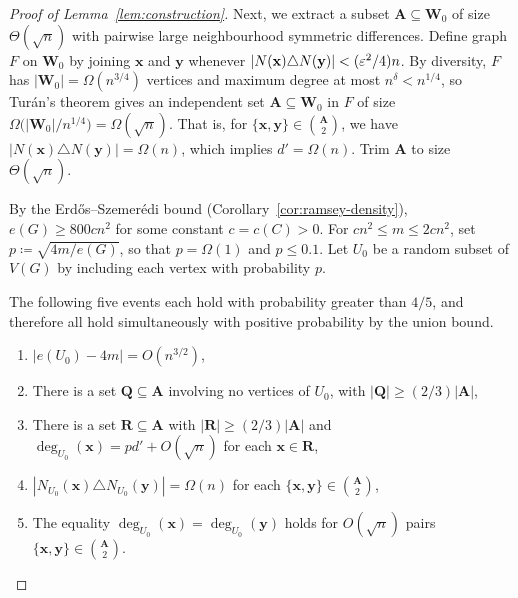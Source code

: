 \begin{proof}[Proof of Lemma~\ref{lem:construction}]
Next, we extract a subset $\mathbf{A} \subseteq \mathbf{W}_0$ of size $\Theta(\sqrt{n})$ with pairwise large neighbourhood symmetric differences. Define graph $F$ on $\mathbf{W}_0$ by joining $\mathbf{x}$ and $\mathbf{y}$ whenever $|N(\mathbf{x}) \triangle N(\mathbf{y})| < (\varepsilon^2/4)n$. By diversity, $F$ has $|\mathbf{W}_0| = \Omega(n^{3/4})$ vertices and maximum degree at most $n^{\delta} < n^{1/4}$, so Tur\'{a}n's theorem gives an independent set $\mathbf{A} \subseteq \mathbf{W}_0$ in $F$ of size $\Omega\bigl(|\mathbf{W}_0|/n^{1/4}\bigr) = \Omega(\sqrt{n})$. That is, for $\{\mathbf{x}, \mathbf{y}\} \in \binom{\mathbf{A}}{2}$, we have $|N(\mathbf{x}) \triangle N(\mathbf{y})| = \Omega(n)$, which implies $d' = \Omega(n)$. Trim $\mathbf{A}$ to size $\Theta(\sqrt{n})$.

By the Erd\H{o}s--Szemer\'{e}di bound (Corollary~\ref{cor:ramsey-density}), $e(G) \geq 800cn^2$ for some constant $c = c(C) > 0$. For $cn^2 \leq m \leq 2cn^2$, set $p \coloneqq \sqrt{4m/e(G)}$, so that $p = \Omega(1)$ and $p \leq 0.1$. Let $U_0$ be a random subset of $V(G)$ by including each vertex with probability $p$. 

\begin{claim}
  The following five events each hold with probability greater than $4/5$, and therefore all hold simultaneously with positive probability by the union bound.

  \begin{enumerate}
    \item[(i)] $|e(U_0) - 4m| = O(n^{3/2})$,
    \item[(ii)] There is a set $\mathbf{Q} \subseteq \mathbf{A}$ involving no vertices of $U_0$, with $|\mathbf{Q}| \geq (2/3)|\mathbf{A}|$,
    \item[(iii)] There is a set $\mathbf{R} \subseteq \mathbf{A}$ with $|\mathbf{R}| \geq (2/3)|\mathbf{A}|$ and $\deg_{U_0}(\mathbf{x}) = pd' + O(\sqrt{n})$ for each $\mathbf{x} \in \mathbf{R}$,
    \item[(iv)] $|N_{U_0}(\mathbf{x}) \triangle N_{U_0}(\mathbf{y})| = \Omega(n)$ for each $\{\mathbf{x}, \mathbf{y}\} \in \binom{\mathbf{A}}{2}$,
    \item[(v)] The equality $\deg_{U_0}(\mathbf{x}) = \deg_{U_0}(\mathbf{y})$ holds for $O(\sqrt{n})$ pairs $\{\mathbf{x}, \mathbf{y}\} \in \binom{\mathbf{A}}{2}$.
  \end{enumerate}
\end{claim}


\end{proof}
